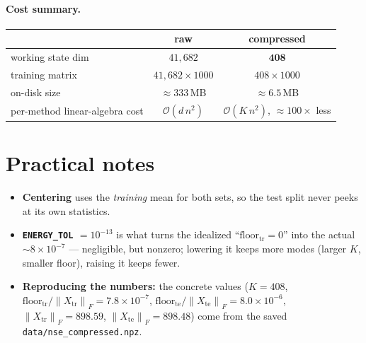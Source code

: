 \documentclass[11pt]{article}
\newcommand{\Xtr}{X_{\mathrm{tr}}}
\newcommand{\Xte}{X_{\mathrm{te}}}
\newcommand{\floortr}{\mathrm{floor}_{\mathrm{tr}}}
\newcommand{\floorte}{\mathrm{floor}_{\mathrm{te}}}
\newcommand{\Fnorm}[1]{\left\lVert#1\right\rVert_F}
\newcommand{\code}[1]{\texttt{#1}}
\begin{document}
\paragraph{Cost summary.}
\begin{center}
\begin{tabular}{@{}lcc@{}}
\toprule
 & raw & compressed \\
\midrule
working state dim & $41{,}682$ & $\mathbf{408}$ \\
training matrix & $41{,}682\times1000$ & $408\times1000$ \\
on-disk size & $\approx 333$\,MB & $\approx 6.5$\,MB \\
per-method linear-algebra cost & $\mathcal O(d\,n^2)$ & $\mathcal O(K\,n^2)$, $\approx 100\times$ less \\
\bottomrule
\end{tabular}
\end{center}

\section{Practical notes}
\begin{itemize}[leftmargin=1.4em]
\item \textbf{Centering} uses the \emph{training} mean for both sets, so the test
  split never peeks at its own statistics.
\item \textbf{\texttt{ENERGY\_TOL} $=10^{-13}$} is what turns the idealized
  ``$\floortr=0$'' into the actual $\sim 8\times10^{-7}$ --- negligible, but
  nonzero; lowering it keeps more modes (larger $K$, smaller floor), raising it
  keeps fewer.
\item \textbf{Reproducing the numbers:} the concrete values
  ($K=408$, $\floortr/\Fnorm{\Xtr}=7.8\times10^{-7}$,
  $\floorte/\Fnorm{\Xte}=8.0\times10^{-6}$, $\Fnorm{\Xtr}=898.59$,
  $\Fnorm{\Xte}=898.48$) come from the saved \code{data/nse\_compressed.npz}.
\end{itemize}
\end{document}
